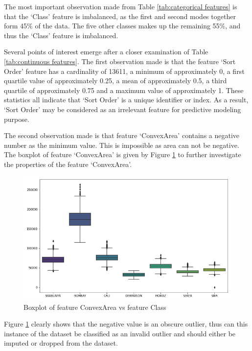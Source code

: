 \documentclass[10pt, conference]{IEEEtran}
\begin{document}
The most important observation made from Table \ref{tab:categorical features} is that the `Class' feature
is imbalanced, as the first and second modes together form 45\% of the data. The five other classes
makes up the remaining 55\%, and thus the `Class' feature is imbalanced.

Several points of interest emerge after a closer examination of Table \ref{tab:continuous features}. The first
observation made is that the feature `Sort Order' feature has a cardinality of 13611, a minimum of approximately 0,
a first quartile value of approximately 0.25, a mean of approximately 0.5, a third quartile of approximately 0.75 and
a maximum value of approximately 1. These statistics all indicate that `Sort Order' is a unique identifier or index.
As a result, `Sort Order' may be considered as an irrelevant feature for predictive modeling purpose.

The second observation made is that feature `ConvexArea' contains a negative number as the minimum value. This is
impossible as area can not be negative. The boxplot of feature `ConvexArea' is given by Figure
\ref{ConvexArea_boxplot_negative} to further investigate the properties of the feature `ConvexArea'.
\begin{figure}[h!]
    \centerline{\includegraphics[scale=0.35]{../Plots/Negative ConvexArea boxplot.png}}
    \caption{Boxplot of feature ConvexArea vs feature Class}
    \label{ConvexArea_boxplot_negative}
\end{figure}

Figure \ref{ConvexArea_boxplot_negative} clearly shows that the negative value is an obscure outlier, thus can this
instance of the dataset be classified as an invalid outlier and should either be imputed or dropped from the dataset.
\end{document}

